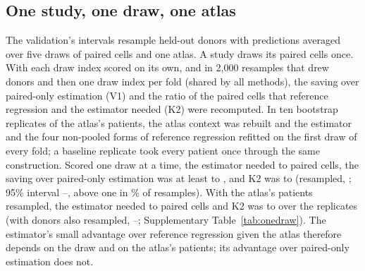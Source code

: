 \begin{table}[h]
\caption{\textbf{Axes and condition maps in the validation test.} Fraction of the within-type dependence recovered (\%), pooled over the \VlNFolds{} held-out samples, and paired cells to the test's primary target (\VlTarget\%) with 95\% intervals from resampling donors. Top: the atlas with its axes and maps (the test's arm), its axes only, its maps only (paired-only single-block James--Stein pooled over types, through the atlas's maps) and neither; the other pools' and the own samples' unpaired cells with and without maps; the best paired-only method at each budget. Bottom: the unchanged atlas and the two atlases with a skewed mix of cell types (Supplementary Table~\ref{tab:robust}), with their unweighted maps, with maps reweighted to each draw's contrast rows per cell type, and without maps.}
\label{tab:axesmaps}
\centering\footnotesize

\end{table}

\subsection*{One study, one draw, one atlas}
The validation's intervals resample held-out donors with predictions averaged over five draws of paired cells and one atlas. A study draws its paired cells once. With each draw index scored on its own, and in 2,000 resamples that drew donors and then one draw index per fold (shared by all methods), the saving over paired-only estimation (V1) and the ratio of the paired cells that reference regression and the estimator needed (K2) were recomputed. In ten bootstrap replicates of the atlas's patients, the atlas context was rebuilt and the estimator and the four non-pooled forms of reference regression refitted on the first draw of every fold; a baseline replicate took every patient once through the same construction. Scored one draw at a time, the estimator needed \RvDrawCellsMin{} to \RvDrawCellsMax{} paired cells, the saving over paired-only estimation was at least \RvDrawVOneMin{} to \RvDrawVOneMax, and K2 was \RvDrawKTwoMin{} to \RvDrawKTwoMax{} (resampled, \RvDrawKTwoMed; 95\% interval \RvDrawKTwoLo--\RvDrawKTwoHi, above one in \RvDrawKTwoShare\% of resamples). With the atlas's patients resampled, the estimator needed \RvAtlasCellsMin{} to \RvAtlasCellsMax{} paired cells and K2 was \RvAtlasKTwoMin{} to \RvAtlasKTwoMax{} over the \RvAtlasReps{} replicates (with donors also resampled, \RvAtlasKTwoLo--\RvAtlasKTwoHi; Supplementary Table~\ref{tab:onedraw}). The estimator's small advantage over reference regression given the atlas therefore depends on the draw and on the atlas's patients; its advantage over paired-only estimation does not.

